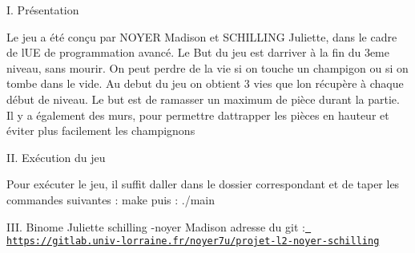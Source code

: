 I. Présentation

Le jeu a été conçu par N\+O\+Y\+ER Madison et S\+C\+H\+I\+L\+L\+I\+NG Juliette, dans le cadre de l\textquotesingle{}UE de programmation avancé. Le But du jeu est d\textquotesingle{}arriver à la fin du 3eme niveau, sans mourir. On peut perdre de la vie si on touche un champigon ou si on tombe dans le vide. Au debut du jeu on obtient 3 vies que l\textquotesingle{}on récupère à chaque début de niveau. Le but est de ramasser un maximum de pièce durant la partie. Il y a également des murs, pour permettre d\textquotesingle{}attrapper les pièces en hauteur et éviter plus facilement les champignons

II. Exécution du jeu

Pour exécuter le jeu, il suffit d\textquotesingle{}aller dans le dossier correspondant et de taper les commandes suivantes \+: make puis \+: ./main

I\+II. Binome Juliette schilling -\/noyer Madison adresse du git \+:\href{https://gitlab.univ-lorraine.fr/noyer7u/projet-l2-noyer-schilling}{\texttt{ https\+://gitlab.\+univ-\/lorraine.\+fr/noyer7u/projet-\/l2-\/noyer-\/schilling}} 
